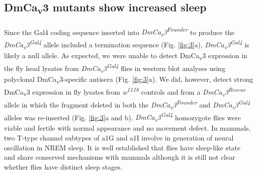 \subsection*{DmCa\textsubscript{v}3 mutants show increased sleep}

Since the Gal4 coding sequence inserted into \emph{DmCa\textsubscript{v}3\textsuperscript{Founder}} to produce the \emph{DmCa\textsubscript{v}3\textsuperscript{Gal4}} allele included a termination sequence (Fig. \ref{fig:3}a), \emph{DmCa\textsubscript{v}3\textsuperscript{Gal4}} is likely a null allele.
As expected, we were unable to detect DmCa\textsubscript{v}3 expression in the fly head lysates from \emph{DmCa\textsubscript{v}3\textsuperscript{Gal4}} flies in western blot analyses using polyclonal DmCa\textsubscript{v}3-specific antisera (Fig. \ref{fig:3}a). We did, however, detect strong DmCa\textsubscript{v}3 expression in fly lysates from \emph{w\textsuperscript{1118}} controls and from a \emph{DmCa\textsubscript{v}3\textsuperscript{Rescue}} allele in which the fragment deleted in both the \emph{DmCa\textsubscript{v}3\textsuperscript{Founder}} and \emph{DmCa\textsubscript{v}3\textsuperscript{Gal4}} alleles was re-inserted (Fig. \ref{fig:3}a and b).
\emph{DmCa\textsubscript{v}3\textsuperscript{Gal4}} homozygote flies were viable and fertile with normal appearance and no movement defect.
In mammals, two T-type channel subtypes of a1G and a1I involve in generation of neural oscillation in NREM sleep.
It is well established that flies have sleep-like state and share conserved mechanisms with mammals although it is still not clear whether flies have distinct sleep stages.

